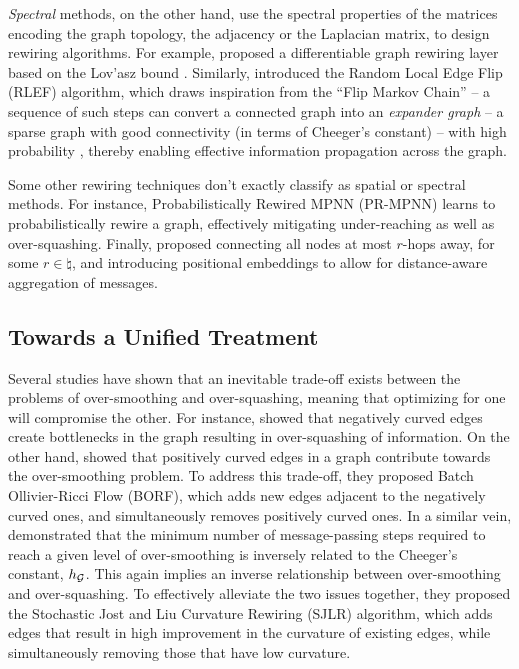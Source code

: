 \textit{Spectral} methods, on the other hand, use the spectral properties of the matrices encoding the graph topology, \eg the adjacency or the Laplacian matrix, to design rewiring algorithms. For example, \citet{rodriguez2022diffwire} proposed a differentiable graph rewiring layer based on the Lov\a'asz bound \cite[Corollary 3.3]{lovasz1993random}. Similarly, \citet{banerjee2022expansion} introduced the Random Local Edge Flip (RLEF) algorithm, which draws inspiration from the ``Flip Markov Chain'' \cite{feder2006markovflip,mahlmann2005ksplitter} -- a sequence of such steps can convert a connected graph into an \textit{expander graph} -- a sparse graph with good connectivity (in terms of Cheeger's constant) --  with high probability \cite{allen2016expanders,giakkoupis2022expanders,cooper2019flipmarkov,feder2006markovflip,mahlmann2005ksplitter}, thereby enabling effective information propagation across the graph.

Some other rewiring techniques don't exactly classify as spatial or spectral methods. For instance, Probabilistically Rewired MPNN (PR-MPNN) \cite{qian2024prmpnn} learns to probabilistically rewire a graph, effectively mitigating under-reaching as well as over-squashing. Finally, \cite{brüelgabrielsson2023positional} proposed connecting all nodes at most $r$-hops away, for some $r\in\natural$, and introducing positional embeddings to allow for distance-aware aggregation of messages.

\subsection{Towards a Unified Treatment}

Several studies have shown that an inevitable trade-off exists between the problems of over-smoothing and over-squashing, meaning that optimizing for one will compromise the other. For instance, \citet{topping2022understanding,nguyen2023revisiting} showed that negatively curved edges create bottlenecks in the graph resulting in over-squashing of information. On the other hand, \citet[Proposition 4.3]{nguyen2023revisiting} showed that positively curved edges in a graph contribute towards the over-smoothing problem. To address this trade-off, they proposed Batch Ollivier-Ricci Flow (BORF), which adds new edges adjacent to the negatively curved ones, and simultaneously removes positively curved ones.
In a similar vein, \citet{giraldo2023trading} demonstrated that the minimum number of message-passing steps required to reach a given level of over-smoothing is inversely related to the Cheeger's constant, $h_{\mathcal{G}}$. This again implies an inverse relationship between over-smoothing and over-squashing. 
To effectively alleviate the two issues together, they proposed the Stochastic Jost and Liu Curvature Rewiring (SJLR) algorithm, which adds edges that result in high improvement in the curvature of existing edges, while simultaneously removing those that have low curvature.

